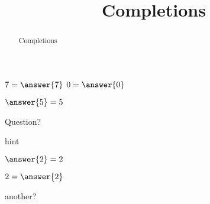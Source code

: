 \documentclass{ximera}
\title{Completions}
\begin{document}
\begin{abstract}
  Completions
\end{abstract}
\maketitle

\begin{example}

  $7 = \answer{7}$
  $0 = \answer{0}$

  \begin{question}
    \begin{multipleChoice}
    \end{multipleChoice}
    
    \begin{feedback}[correct]
      $\answer{5} = 5$
    \end{feedback}
  \end{question}
  
  \begin{question}
    Question?

    \begin{hint}
      hint
    \end{hint}
    
    \begin{multipleChoice}
    \end{multipleChoice}

    \begin{feedback}[correct]
      $\answer{2} = 2$
    \end{feedback}
  \end{question}
\end{example}

\begin{example}
  $2 = \answer{2}$

  \begin{question}
    \begin{multipleChoice}
    \end{multipleChoice}

    \begin{feedback}[correct]
      another?
      \begin{multipleChoice}
      \end{multipleChoice} 
    \end{feedback}
  \end{question}
\end{example}
\end{document}
